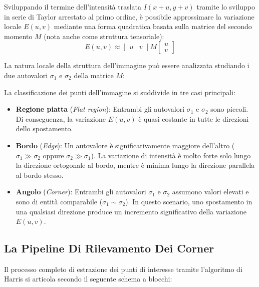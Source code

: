 ﻿\documentclass[11pt, a4paper]{article}
\begin{document}
Sviluppando il termine dell'intensità traslata $I(x + u, y + v)$ tramite lo sviluppo in serie di Taylor arrestato al primo ordine, è possibile approssimare la variazione locale $E(u, v)$ mediante una forma quadratica basata sulla matrice del secondo momento $M$ (nota anche come struttura tensoriale):
\[ E(u, v) \approx \begin{bmatrix} u & v \end{bmatrix} M \begin{bmatrix} u \\ v \end{bmatrix} \]

La natura locale della struttura dell'immagine può essere analizzata studiando i due autovalori $\sigma_1$ e $\sigma_2$ della matrice $M$:


La classificazione dei punti dell'immagine si suddivide in tre casi principali:
\begin{itemize}
    \item \textbf{Regione piatta} (\emph{Flat region}): Entrambi gli autovalori $\sigma_1$ e $\sigma_2$ sono piccoli. Di conseguenza, la variazione $E(u, v)$ è quasi costante in tutte le direzioni dello spostamento.
    \item \textbf{Bordo} (\emph{Edge}): Un autovalore è significativamente maggiore dell'altro ($\sigma_1 \gg \sigma_2$ oppure $\sigma_2 \gg \sigma_1$). La variazione di intensità è molto forte solo lungo la direzione ortogonale al bordo, mentre è minima lungo la direzione parallela al bordo stesso.
    \item \textbf{Angolo} (\emph{Corner}): Entrambi gli autovalori $\sigma_1$ e $\sigma_2$ assumono valori elevati e sono di entità comparabile ($\sigma_1 \sim \sigma_2$). In questo scenario, uno spostamento in una qualsiasi direzione produce un incremento significativo della variazione $E(u, v)$.
\end{itemize}

\subsection{La Pipeline Di Rilevamento Dei Corner}

Il processo completo di estrazione dei punti di interesse tramite l'algoritmo di Harris si articola secondo il seguente schema a blocchi:
\end{document}
